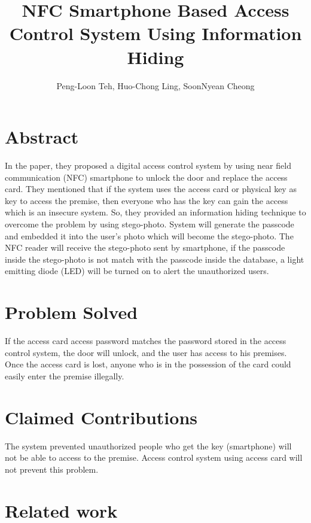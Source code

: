 \documentclass[•]{article}
\title{NFC Smartphone Based Access Control System Using Information Hiding}
\author{Peng-Loon Teh, Huo-Chong Ling, SoonNyean Cheong}
\date{}
\begin{document}

\tableofcontents
\maketitle

\section{Abstract}
\hspace{1cm}In the paper, they proposed a digital access control system by using near field communication (NFC) smartphone to unlock the door and replace the access card. They mentioned that if the system uses the access card or physical key as key to access the premise, then everyone who has the key can gain the access which is an insecure system. So, they provided an information hiding technique to overcome the problem by using stego-photo. System will generate the passcode and embedded it into the user’s photo which will become the stego-photo. The NFC reader will receive the stego-photo sent by smartphone, if the passcode inside the stego-photo is not match with the passcode inside the database, a light emitting diode (LED) will be turned on to alert the unauthorized users. ~\cite{Katzenbeisser2000}

\section{Problem Solved}
If the access card access password matches the password stored in the access control system, the door will unlock, and the user has access to his premises.
Once the access card is lost, anyone who is in the possession of the card could easily enter the premise illegally.

\section{Claimed Contributions}
The system prevented unauthorized people who get the key (smartphone) will not be able to access to the premise. Access control system using access card will not prevent this problem.
\section{Related work}
\end{document}
